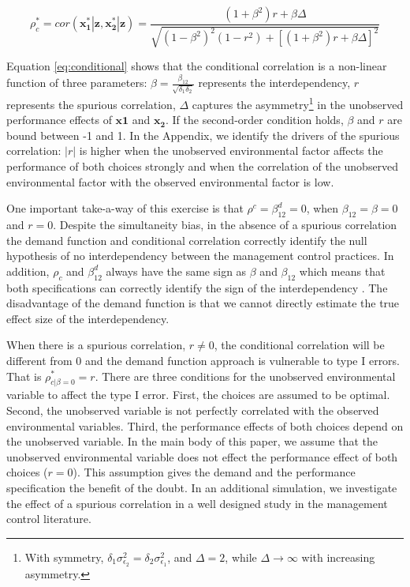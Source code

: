 \documentclass[12pt]{article}
\begin{document}
\begin{equation} \label{eq:conditional}
\rho^*_c = cor(\mathbf{x_1^*|z, x_2^*|z}) =
\frac{
  (1 + \beta^2) r + \beta \Delta
}{
\sqrt{
  (1 - \beta^2)^2 (1 - r^2)
  + [(1 + \beta^2) r + \beta \Delta] ^ 2
}}
\end{equation}

Equation \eqref{eq:conditional} shows that the conditional correlation
is a non-linear function of three parameters:
\(\beta = \frac{\beta_{12}}{\sqrt{\delta_1\delta_2}}\) represents the
interdependency, \(r\) represents the spurious correlation, \(\Delta\)
captures the asymmetry\footnote{With symmetry,
  \(\delta_1 \sigma^2_{\epsilon_2} = \delta_2 \sigma^2_{\epsilon_1}\),
  and \(\Delta =2\), while \(\Delta \to \infty\) with increasing
  asymmetry.} in the unobserved performance effects of \(\mathbf{x1}\)
and \(\mathbf{x_2}\). If the second-order condition holds, \(\beta\) and
\(r\) are bound between -1 and 1. In the Appendix, we identify the
drivers of the spurious correlation: \(|r|\) is higher when the
unobserved environmental factor affects the performance of both choices
strongly and when the correlation of the unobserved environmental factor
with the observed environmental factor is low.

One important take-a-way of this exercise is that
\(\rho^c = \beta^d_{12} = 0\), when \(\beta_{12} = \beta = 0\) and
\(r = 0\). Despite the simultaneity bias, in the absence of a spurious
correlation the demand function and conditional correlation correctly
identify the null hypothesis of no interdependency between the
management control practices. In addition, \(\rho_c\) and
\(\beta^d_{12}\) always have the same sign as \(\beta\) and
\(\beta_{12}\) which means that both specifications can correctly
identify the sign of the interdependency \citep{Arora1996}. The
disadvantage of the demand function is that we cannot directly estimate
the true effect size of the interdependency.

When there is a spurious correlation, \(r \neq 0\), the conditional
correlation will be different from 0 and the demand function approach is
vulnerable to type I errors. That is \(\rho^*_{c|\beta=0} = r\). There
are three conditions for the unobserved environmental variable to affect
the type I error. First, the choices are assumed to be optimal. Second,
the unobserved variable is not perfectly correlated with the observed
environmental variables. Third, the performance effects of both choices
depend on the unobserved variable. In the main body of this paper, we
assume that the unobserved environmental variable does not effect the
performance effect of both choices (\(r = 0\)). This assumption gives
the demand and the performance specification the benefit of the doubt.
In an additional simulation, we investigate the effect of a spurious
correlation in a well designed study in the management control
literature.
\end{document}
